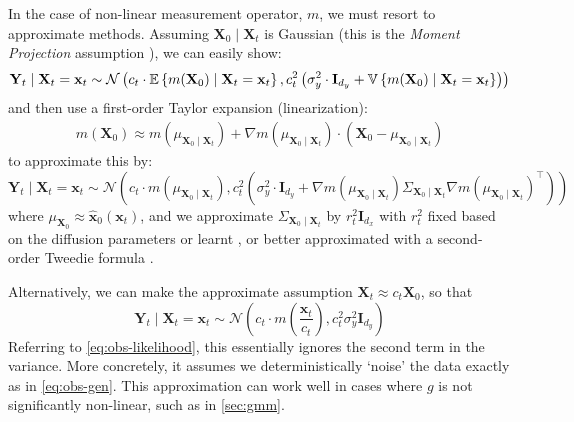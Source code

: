 In the case of non-linear measurement operator, $m$, we must resort to approximate methods.
Assuming $\mathbf{X}_0 \mid \mathbf{X}_t$ is Gaussian (this is the \emph{Moment Projection}
assumption \parencite{boysTweedieMomentProjected2023}), we can easily show:
\begin{equation*}
    \mathbf{Y}_t \mid \mathbf{X}_t = \mathbf{x}_t \sim \mathcal{N}\left(c_t\cdot\mathbb{E} \left\{ m(\mathbf{X}_0) \mid \mathbf{X}_t = \mathbf{x}_t \right\}, c_t^2\left(\sigma_y^2\cdot \mathbf{I}_{d_y} + \mathbb{V} \left\{ m(\mathbf{X}_0) \mid \mathbf{X}_t = \mathbf{x}_t \right\}\right)\right)
\end{equation*}
and then use a first-order Taylor expansion (linearization):
\begin{eqnarray}
    m(\mathbf{X}_0) \approx m(\mu_{\mathbf{X}_0 \mid \mathbf{X}_t}) + \nabla m(\mu_{\mathbf{X}_0 \mid \mathbf{X}_t})\cdot (\mathbf{X}_0 - \mu_{\mathbf{X}_0 \mid \mathbf{X}_t})
\end{eqnarray}
to approximate this by:
\begin{equation*}
    \mathbf{Y}_t \mid \mathbf{X}_t = \mathbf{x}_t \sim \mathcal{N}\left(c_t\cdot m(\mu_{\mathbf{X}_0 \mid \mathbf{X}_t}), c_t^2\left(\sigma_y^2\cdot \mathbf{I}_{d_y} + \nabla m(\mu_{\mathbf{X}_0 \mid \mathbf{X}_t})\Sigma_{\mathbf{X}_0 \mid \mathbf{X}_t}\nabla m(\mu_{\mathbf{X}_0 \mid \mathbf{X}_t})^\top\right)\right)
\end{equation*}
where $\mu_{\mathbf{X}_0} \approx \hat{\mathbf{x}}_0(\mathbf{x}_t)$, and we approximate
$\Sigma_{\mathbf{X}_0 \mid \mathbf{X}_t}$ by $r_t^2\mathbf{I}_{d_x}$ with $r_t^2$ fixed based on
the diffusion parameters \parencite{hoDenoisingDiffusionProbabilistic2020} or learnt
\parencite{nicholImprovedDenoisingDiffusion2021}, or better approximated with a second-order
Tweedie formula \parencite{boysTweedieMomentProjected2023}.

Alternatively, we can make the approximate assumption $\mathbf{X}_t \approx c_t\mathbf{X}_0$, so
that
\begin{equation*}
    \mathbf{Y}_t \mid \mathbf{X}_t = \mathbf{x}_t \sim \mathcal{N}\left(c_t\cdot m\left(\frac{\mathbf{x}_t}{c_t}\right), c_t^2\sigma_y^2\mathbf{I}_{d_y}\right)
\end{equation*}
Referring to \ref{eq:obs-likelihood}, this essentially ignores the second term in the variance.
More concretely, it assumes we deterministically `noise' the data exactly as in \ref{eq:obs-gen}.
This approximation can work well in cases where $g$ is not significantly non-linear, such as in
\autoref{sec:gmm}.

